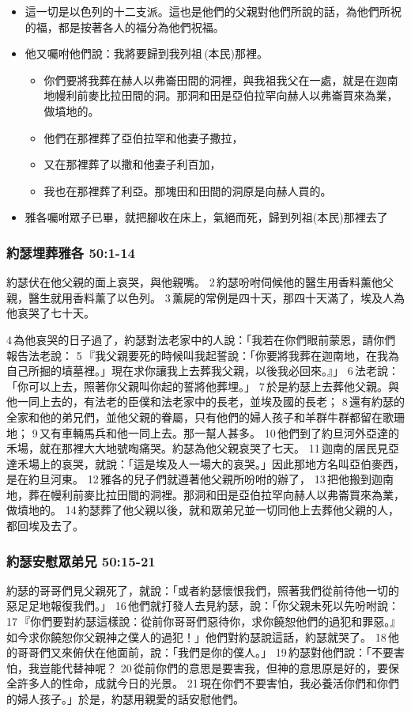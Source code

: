 \begin{itemize}
\item 這一切是以色列的十二支派。這也是他們的父親對他們所說的話，為他們所祝的福，都是按著各人的福分為他們祝福。 
\item 他又囑咐他們說：我將要歸到我列祖 (本民)那裡。
\begin{itemize} 
\itemsep-.35em 
\item 你們要將我葬在赫人以弗崙田間的洞裡，與我祖我父在一處，就是在迦南地幔利前麥比拉田間的洞。那洞和田是亞伯拉罕向赫人以弗崙買來為業，做墳地的。 
\item 他們在那裡葬了亞伯拉罕和他妻子撒拉，
\item 又在那裡葬了以撒和他妻子利百加，
\item 我也在那裡葬了利亞。那塊田和田間的洞原是向赫人買的。
\end{itemize}
\item 雅各囑咐眾子已畢，就把腳收在床上，氣絕而死，歸到列祖(本民)那裡去了
\end{itemize}


\subsubsection{約瑟埋葬雅各 50:1-14}
約瑟伏在他父親的面上哀哭，與他親嘴。 2 約瑟吩咐伺候他的醫生用香料薰他父親，醫生就用香料薰了以色列。 3 薰屍的常例是四十天，那四十天滿了，埃及人為他哀哭了七十天。

4 為他哀哭的日子過了，約瑟對法老家中的人說：「我若在你們眼前蒙恩，請你們報告法老說： 5 『我父親要死的時候叫我起誓說：「你要將我葬在迦南地，在我為自己所掘的墳墓裡。」現在求你讓我上去葬我父親，以後我必回來。』」 6 法老說：「你可以上去，照著你父親叫你起的誓將他葬埋。」 7 於是約瑟上去葬他父親。與他一同上去的，有法老的臣僕和法老家中的長老，並埃及國的長老； 8 還有約瑟的全家和他的弟兄們，並他父親的眷屬，只有他們的婦人孩子和羊群牛群都留在歌珊地； 9 又有車輛馬兵和他一同上去。那一幫人甚多。 10 他們到了約旦河外亞達的禾場，就在那裡大大地號啕痛哭。約瑟為他父親哀哭了七天。 11 迦南的居民見亞達禾場上的哀哭，就說：「這是埃及人一場大的哀哭。」因此那地方名叫亞伯麥西，是在約旦河東。 12 雅各的兒子們就遵著他父親所吩咐的辦了， 13 把他搬到迦南地，葬在幔利前麥比拉田間的洞裡。那洞和田是亞伯拉罕向赫人以弗崙買來為業，做墳地的。 14 約瑟葬了他父親以後，就和眾弟兄並一切同他上去葬他父親的人，都回埃及去了。

\subsubsection{約瑟安慰眾弟兄 50:15-21}
約瑟的哥哥們見父親死了，就說：「或者約瑟懷恨我們，照著我們從前待他一切的惡足足地報復我們。」 16 他們就打發人去見約瑟，說：「你父親未死以先吩咐說： 17 『你們要對約瑟這樣說：從前你哥哥們惡待你，求你饒恕他們的過犯和罪惡。』如今求你饒恕你父親神之僕人的過犯！」他們對約瑟說這話，約瑟就哭了。 18 他的哥哥們又來俯伏在他面前，說：「我們是你的僕人。」 19 約瑟對他們說：「不要害怕，我豈能代替神呢？ 20 從前你們的意思是要害我，但神的意思原是好的，要保全許多人的性命，成就今日的光景。 21 現在你們不要害怕，我必養活你們和你們的婦人孩子。」於是，約瑟用親愛的話安慰他們。

